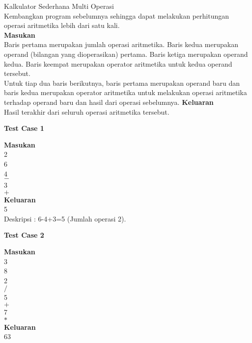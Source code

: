 \newpage
\begin{permasalahan}{Kalkulator Sederhana Multi Operasi}\\
	Kembangkan program sebelumnya sehingga dapat melakukan perhitungan operasi aritmetika lebih dari satu kali.\\
	\textbf{Masukan}\\
	Baris pertama merupakan jumlah operasi aritmetika. Baris kedua merupakan operand (bilangan yang dioperasikan) pertama. Baris ketiga merupakan operand kedua. Baris keempat merupakan operator aritmetika untuk kedua operand tersebut.\\
	Untuk tiap dua baris berikutnya, baris pertama merupakan operand baru dan baris kedua merupakan operator aritmetika untuk melakukan operasi aritmetika terhadap operand baru dan hasil dari operasi sebelumnya.
	\textbf{Keluaran}\\
	Hasil terakhir dari seluruh operasi aritmetika tersebut.\\
	\begin{center}
	\textbf{Test Case 1}\\
	\end{center}
	\textbf{Masukan}\\
	2\\
	6\\
	4\\
	$-$\\
	3\\
	$+$\\
	\textbf{Keluaran}\\
	5\\
	Deskripsi : 6-4+3=5 (Jumlah operasi 2).
	\begin{center}
	\textbf{Test Case 2}\\
	\end{center}
	\textbf{Masukan}\\
	3\\
	8\\
	2\\
	$/$\\
	5\\
	$+$\\
	7\\
	$*$\\
	\textbf{Keluaran}\\
	63\\
\end{permasalahan}

